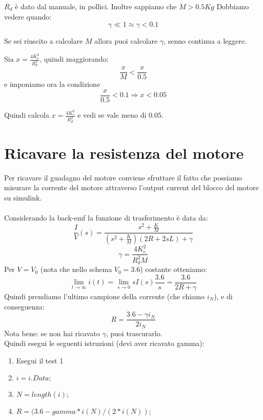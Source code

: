 \documentclass[10pt,a4paper]{article}
\begin{document}
$R_d$ è dato dal manuale, in pollici. Inoltre sappiamo che $M > 0.5Kg$
Dobbiamo vedere quando:
$$\gamma \ll 1 \approx \gamma < 0.1$$

Se sei riuscito a calcolare $M$ allora puoi calcolare $\gamma$, senno continua a leggere.

Sia $ x= \frac{4K_e^2}{R_d^2}$, quindi maggiorando:
$$ \frac{x}{M} < \frac{x}{0.5}$$
e imponiamo ora la condizione
$$\frac{x}{0.5}<0.1 \Rightarrow x < 0.05$$

Quindi calcola $ x= \frac{4K_e^2}{R_d^2}$ e vedi se vale meno di $0.05$.

\newpage
\section{Ricavare la resistenza del motore}
Per ricavare il guadagno del motore conviene sfruttare il fatto che possiamo misurare la corrente del motore attraverso l'output current del blocco del motore su simulink. \\ \\
Considerando la back-emf la funzione di trasferimento è data da:
$$\frac{I}{V}(s) = \frac{s^2+\frac{K}{M}}{(s^2+\frac{K}{M})(2R+2sL)+\gamma }$$
$$\gamma = \frac{4K_e^2}{R_d^2M}$$
Per $V=V_0$ (nota che nello schema $V_0=3.6$) costante otteniamo:
$$\lim_{t \to \infty} i(t) = \lim_{s \to 0} sI(s)\frac{3.6}{s} = \frac{3.6}{2R+\gamma}$$
Quindi prendiamo l'ultimo campione della corrente (che chiamo $i_N$), e di conseguenza:
$$R = \frac{3.6-\gamma i_N}{2i_N}$$
Nota bene: se non hai ricavato $\gamma$, puoi trascurarlo.\\
Quindi esegui le seguenti istruzioni (devi aver ricavato gamma):
\begin{enumerate}
\item Esegui il test 1
\item $i=i.Data;$
\item $N=length(i);$
\item $ R = (3.6-gamma*i(N)/(2*i(N));$
\end{enumerate}
\end{document}
